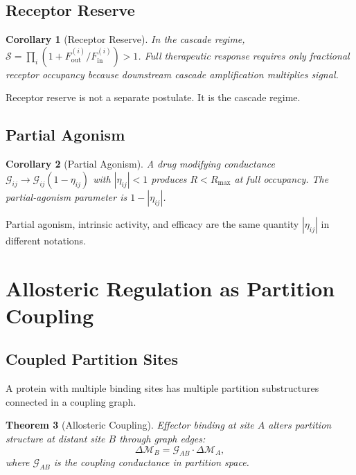 \documentclass[twocolumn,10pt,a4paper]{article}
\newtheorem{theorem}{Theorem}[section]
\newtheorem{corollary}[theorem]{Corollary}
\theoremstyle{definition}
\theoremstyle{remark}
\newcommand{\Depth}{\mathcal{M}}
\newcommand{\Gcond}{\mathcal{G}}
\begin{document}
\subsection{Receptor Reserve}

\begin{corollary}[Receptor Reserve]
In the cascade regime, $\mathcal{S} = \prod_i(1+F_{\mathrm{out}}^{(i)}/F_{\mathrm{in}}^{(i)}) > 1$. Full therapeutic response requires only fractional receptor occupancy because downstream cascade amplification multiplies signal.
\end{corollary}

Receptor reserve is not a separate postulate. It is the cascade regime.

\subsection{Partial Agonism}

\begin{corollary}[Partial Agonism]
A drug modifying conductance $\Gcond_{ij}\to\Gcond_{ij}(1-\eta_{ij})$ with $|\eta_{ij}|<1$ produces $R<R_{\max}$ at full occupancy. The partial-agonism parameter is $1-|\eta_{ij}|$.
\end{corollary}

Partial agonism, intrinsic activity, and efficacy are the same quantity $|\eta_{ij}|$ in different notations.

\section{Allosteric Regulation as Partition Coupling}

\subsection{Coupled Partition Sites}

A protein with multiple binding sites has multiple partition substructures connected in a coupling graph.

\begin{theorem}[Allosteric Coupling]
\label{thm:allostery}
Effector binding at site $A$ alters partition structure at distant site $B$ through graph edges:
\begin{equation}
    \Delta\Depth_B = \Gcond_{AB}\cdot\Delta\Depth_A,
\end{equation}
where $\Gcond_{AB}$ is the coupling conductance in partition space.
\end{theorem}
\end{document}
